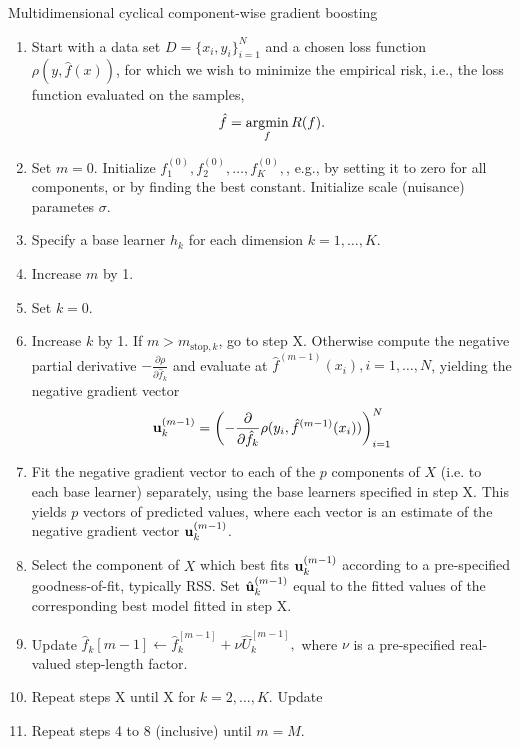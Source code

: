 \begin{algorithm}
\caption{Multidimensional cyclical component-wise gradient boosting}
\label{algo:multi-cyclical}
\begin{enumerate}
    \item Start with a data set $D=\{x_i, y_i\}_{i=1}^N$ and a chosen loss function $\rho(y,\hat{f}(x))$, for which we wish to
        minimize the empirical risk, i.e., the loss function evaluated on the samples,
        \begin{equation}
            \hat{f}=\operatorname*{argmin}_{f}R(f).
        \end{equation}
    \item Set $m=0$. Initialize $f^{(0)}_1,f^{(0)}_2,\ldots,f^{(0)}_K,$, e.g., by setting it to zero for all components, or by finding the best constant. Initialize scale (nuisance) parametes $\sigma$.
    \item Specify a base learner $h_k$ for each dimension $k=1,\ldots,K$.
    \item Increase $m$ by 1.
    \item Set $k=0$.
    \item Increase $k$ by 1. If $m>m_{\text{stop},k}$, go to step X. Otherwise compute the negative partial derivative
        $-\frac{\partial\rho}{\partial \hat{f}_k}$ and evaluate at $\hat{f}^{(m-1)}(x_i),i=1,\ldots,N$, yielding the
        negative gradient vector
        \begin{equation}
            \mathbf{u}^{(m-1)}_k=\left(-\frac{\partial}{\partial \hat{f}_k}\rho(y_i, \hat{f}^{(m-1)}(x_i))\right)_{i=1}^N
        \end{equation}
    \item Fit the negative gradient vector to each of the $p$ components of $X$ (i.e. to each base learner) separately, using the base learners specified in step X. This yields $p$ vectors of predicted values, where each vector is an estimate of the negative gradient vector $\mathbf{u}^{(m-1)}_k$.
    \item Select the component of $X$ which best fits $\mathbf{u}^{(m-1)}_k$ according to a pre-specified goodness-of-fit, typically RSS.
        Set $\hat{\mathbf{u}}^{(m-1)}_k$ equal to the fitted values of the corresponding best model fitted in step X.
    \item Update $\hat{f}_k{[m-1]}\gets\hat{f}_k^{[m-1]}+\nu\hat{U}_k^{[m-1]},$ where $\nu$ is a pre-specified real-valued step-length factor.
    \item Repeat steps X until X for $k=2,\ldots,K$. Update 
    \item Repeat steps 4 to 8 (inclusive) until $m=M$.

\end{enumerate}
\end{algorithm}
